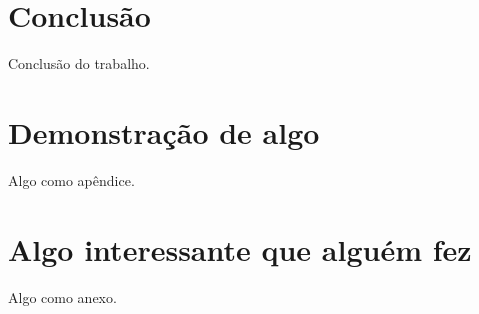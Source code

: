 \documentclass[oneside,openright,12pt]{ufsm_2021} %
\begin{document}
\chapter{Conclusão}

	\par Conclusão do trabalho.
	\lipsum[1-5]


	
	




\startbibliography %


	
\apendice %

\chapter{Demonstração de algo}
        \par Algo como apêndice.  
         \lipsum[2-10]

          
        \anexo    %
        
\chapter{Algo interessante que alguém fez}
         \par Algo como anexo.
         \lipsum[2-10]
                  
\end{document}
